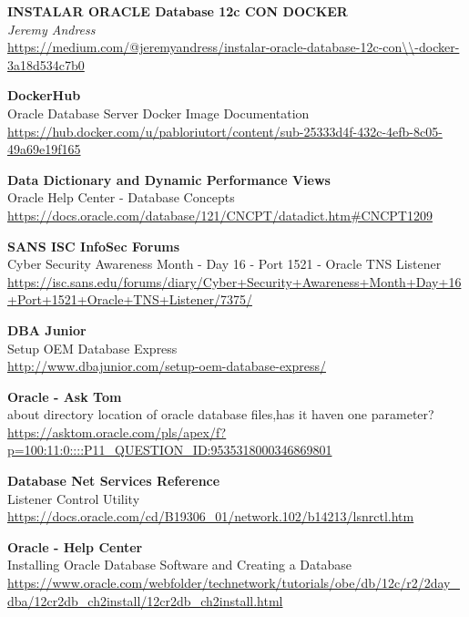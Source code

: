 \documentclass[10pt,a4paper]{article}
\begin{document}
\begin{thebibliography}{9}

	\textbf{INSTALAR ORACLE Database 12c CON DOCKER}\\
	\textit{Jeremy Andress}\\
	\url{https://medium.com/@jeremyandress/instalar-oracle-database-12c-con\\-docker-3a18d534c7b0}

	\textbf{DockerHub}\\
	Oracle Database Server Docker Image Documentation
	\url{https://hub.docker.com/u/pabloriutort/content/sub-25333d4f-432c-4efb-8c05-49a69e19f165}
	
  \textbf{Data Dictionary and Dynamic Performance Views}\\
  Oracle Help Center - Database Concepts\\
  \url{https://docs.oracle.com/database/121/CNCPT/datadict.htm#CNCPT1209}
 
	\textbf{SANS ISC InfoSec Forums}\\
	Cyber Security Awareness Month - Day 16 - Port 1521 - Oracle TNS Listener\\
	\url{https://isc.sans.edu/forums/diary/Cyber+Security+Awareness+Month+Day+16+Port+1521+Oracle+TNS+Listener/7375/}

	\textbf{DBA Junior}\\
	Setup OEM Database Express\\
	\url{http://www.dbajunior.com/setup-oem-database-express/}

	\textbf{Oracle - Ask Tom}\\
	about directory location of oracle database files,has it haven one parameter?\\
	\url{https://asktom.oracle.com/pls/apex/f?p=100:11:0::::P11_QUESTION_ID:9535318000346869801}

	\textbf{Database Net Services Reference}\\
	Listener Control Utility\\
	\url{https://docs.oracle.com/cd/B19306_01/network.102/b14213/lsnrctl.htm}

	\textbf{Oracle - Help Center}\\
	Installing Oracle Database Software and Creating a Database\\
	\url{https://www.oracle.com/webfolder/technetwork/tutorials/obe/db/12c/r2/2day_dba/12cr2db_ch2install/12cr2db_ch2install.html}


\end{thebibliography}
\end{document}

